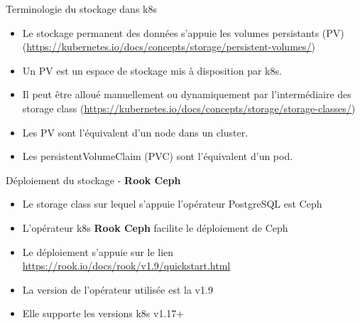 \begin{frame}[shrink=8,fragile]{Terminologie du stockage dans k8s}

\begin{itemize}
   \item Le stockage permanent des données s'appuie les volumes persistants (PV) (\url{https://kubernetes.io/docs/concepts/storage/persistent-volumes/})
   \item Un PV est un espace de stockage mis à disposition par k8s.
   \item Il peut être alloué manuellement ou dynamiquement par l'intermédiaire des storage class (\url{https://kubernetes.io/docs/concepts/storage/storage-classes/})
   \item Les PV sont l'équivalent d'un node dans un cluster.
   \item Les persistentVolumeClaim (PVC) sont l'équivalent d'un pod.
\end{itemize}

\end{frame}


\begin{frame}[fragile]{Déploiement du stockage - \textbf{Rook Ceph}}

\begin{itemize}
   \item Le storage class sur lequel s'appuie l'opérateur PostgreSQL est Ceph
   \item L'opérateur k8s \textbf{Rook Ceph} facilite le déploiement de Ceph
   \item Le déploiement s'appuie sur le lien \url{https://rook.io/docs/rook/v1.9/quickstart.html}
   \item La version de l'opérateur utilisée est la v1.9
   \item Elle supporte les versions k8s v1.17+
\end{itemize}

\end{frame}


